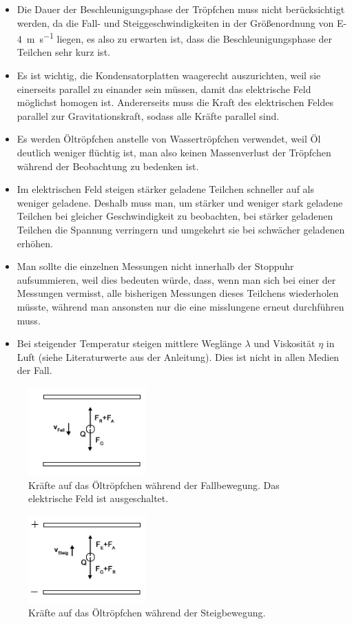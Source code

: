\documentclass[
	a4paper,
	12pt,
	pagesize,
	ngerman
]{scrartcl}
\begin{document}
\begin{itemize}
		\item Die Dauer der Beschleunigungsphase der Tröpfchen muss nicht berücksichtigt werden, da die Fall- und Steiggeschwindigkeiten in der Größenordnung von \SI{E-4}{\meter \per \second} liegen, es also zu erwarten ist, dass die Beschleunigungsphase der Teilchen sehr kurz ist. 
		\item Es ist wichtig, die Kondensatorplatten waagerecht auszurichten, weil sie einerseits parallel zu einander sein müssen, damit das elektrische Feld möglichst homogen ist.
		Andererseits muss die Kraft des elektrischen Feldes parallel zur Gravitationskraft, sodass alle Kräfte parallel sind.
		\item Es werden Öltröpfchen anstelle von Wassertröpfchen verwendet, weil Öl deutlich weniger flüchtig ist, man also keinen Massenverlust der Tröpfchen während der Beobachtung zu bedenken ist.
		\item Im elektrischen Feld steigen stärker geladene Teilchen schneller auf als weniger geladene. Deshalb muss man, um stärker und weniger stark geladene Teilchen bei gleicher Geschwindigkeit zu beobachten, bei stärker geladenen Teilchen die Spannung verringern und umgekehrt sie bei schwächer geladenen erhöhen.
		\item Man sollte die einzelnen Messungen nicht innerhalb der Stoppuhr aufsummieren, weil dies bedeuten würde, dass, wenn man sich bei einer der Messungen vermisst, alle bisherigen Messungen dieses Teilchens wiederholen müsste, während man ansonsten nur die eine misslungene erneut durchführen muss.
		\item Bei steigender Temperatur steigen mittlere Weglänge $ \lambda $ und Viskosität $ \eta $ in Luft (siehe Literaturwerte aus der Anleitung). %
		Dies ist nicht in allen Medien der Fall.
	\end{itemize}
	\begin{figure}[H]
		\includegraphics[width=0.4\textwidth]{fall}
		\centering
		\caption{Kräfte auf das Öltröpfchen während der Fallbewegung. Das elektrische Feld ist ausgeschaltet.\cite{RCL}}
		\label{fall}
		\centering
	\end{figure} 
	\begin{figure}[H]
		\includegraphics[width=0.4\textwidth]{steig}
		\centering
		\caption{Kräfte auf das Öltröpfchen während der Steigbewegung.\cite{RCL}}
		\label{steig}
		\centering
	\end{figure} 
\end{document}
